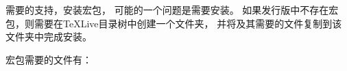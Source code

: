 \documentclass[../main.tex]{subfiles}
\begin{document}
需要的支持，安装宏包，
可能的一个问题是需要安装。
如果发行版中不存在宏包，则需要在TeXLive目录树中创建一个文件夹，
并将及其需要的文件复制到该文件夹中完成安装。

宏包需要的文件有：

\vspace*{8pt}
\end{document}
